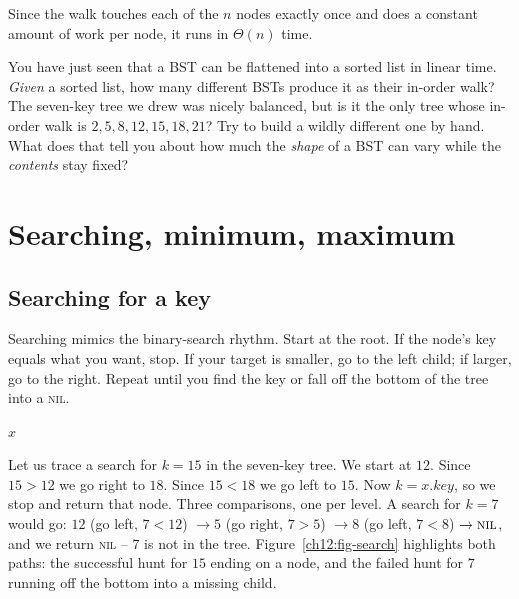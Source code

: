 Since the walk touches each of the $n$ nodes exactly once and does a constant amount of
work per node, it runs in $\Theta(n)$ time.

\begin{walkbox}
You have just seen that a BST can be flattened into a sorted list in linear time. \emph{Given} a sorted list, how many different BSTs
produce it as their in-order walk? The seven-key tree we drew was nicely balanced, but is it
the only tree whose in-order walk is $2,5,8,12,15,18,21$? Try to build a wildly different one
by hand. What does that tell you about how much the \emph{shape} of a BST can vary while the
\emph{contents} stay fixed?
\end{walkbox}

\section{Searching, minimum, maximum}

\subsection{Searching for a key}

Searching mimics the binary-search rhythm.
Start at the root. If the node's key equals what you want, stop. If your target is smaller,
go to the left child; if larger, go to the right. Repeat until you find the key or fall off
the bottom of the tree into a \textsc{nil}.

\begin{algorithm}[H]
\caption{\textsc{Tree-Search}($x$, $k$)}
\Return $x$\;
\end{algorithm}

Let us trace a search for $k = 15$ in the seven-key tree. We start at $12$. Since $15 > 12$
we go right to $18$. Since $15 < 18$ we go left to $15$. Now $k = x.\mathit{key}$, so we stop and
return that node. Three comparisons, one per level. A search for $k = 7$ would go: $12$ (go
left, $7<12$) $\to 5$ (go right, $7>5$) $\to 8$ (go left, $7<8$) $\to \textsc{nil}$, and we
return \textsc{nil} -- $7$ is not in the tree. Figure~\ref{ch12:fig-search} highlights both
paths: the successful hunt for $15$ ending on a node, and the failed hunt for $7$ running off
the bottom into a missing child.

